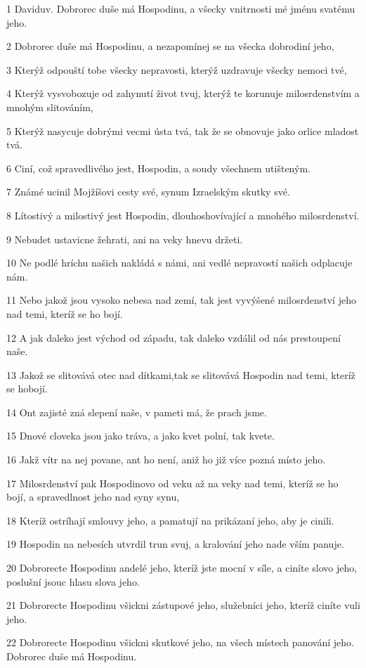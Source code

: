\par 1 Daviduv. Dobrorec duše má Hospodinu, a všecky vnitrnosti mé jménu svatému jeho.
\par 2 Dobrorec duše má Hospodinu, a nezapomínej se na všecka dobrodiní jeho,
\par 3 Kterýž odpouští tobe všecky nepravosti, kterýž uzdravuje všecky nemoci tvé,
\par 4 Kterýž vysvobozuje od zahynutí život tvuj, kterýž te korunuje milosrdenstvím a mnohým slitováním,
\par 5 Kterýž nasycuje dobrými vecmi ústa tvá, tak že se obnovuje jako orlice mladost tvá.
\par 6 Ciní, což spravedlivého jest, Hospodin, a soudy všechnem utišteným.
\par 7 Známé ucinil Mojžíšovi cesty své, synum Izraelským skutky své.
\par 8 Lítostivý a milostivý jest Hospodin, dlouhoshovívající a mnohého milosrdenství.
\par 9 Nebudet ustavicne žehrati, ani na veky hnevu držeti.
\par 10 Ne podlé hríchu našich nakládá s námi, ani vedlé nepravostí našich odplacuje nám.
\par 11 Nebo jakož jsou vysoko nebesa nad zemí, tak jest vyvýšené milosrdenství jeho nad temi, kteríž se ho bojí.
\par 12 A jak daleko jest východ od západu, tak daleko vzdálil od nás prestoupení naše.
\par 13 Jakož se slitovává otec nad dítkami,tak se slitovává Hospodin nad temi, kteríž se hobojí.
\par 14 Ont zajisté zná slepení naše, v pameti má, že prach jsme.
\par 15 Dnové cloveka jsou jako tráva, a jako kvet polní, tak kvete.
\par 16 Jakž vítr na nej povane, ant ho není, aniž ho již více pozná místo jeho.
\par 17 Milosrdenství pak Hospodinovo od veku až na veky nad temi, kteríž se ho bojí, a spravedlnost jeho nad syny synu,
\par 18 Kteríž ostríhají smlouvy jeho, a pamatují na prikázaní jeho, aby je cinili.
\par 19 Hospodin na nebesích utvrdil trun svuj, a kralování jeho nade vším panuje.
\par 20 Dobrorecte Hospodinu andelé jeho, kteríž jste mocní v síle, a ciníte slovo jeho, poslušní jsouc hlasu slova jeho.
\par 21 Dobrorecte Hospodinu všickni zástupové jeho, služebníci jeho, kteríž ciníte vuli jeho.
\par 22 Dobrorecte Hospodinu všickni skutkové jeho, na všech místech panování jeho. Dobrorec duše má Hospodinu.

